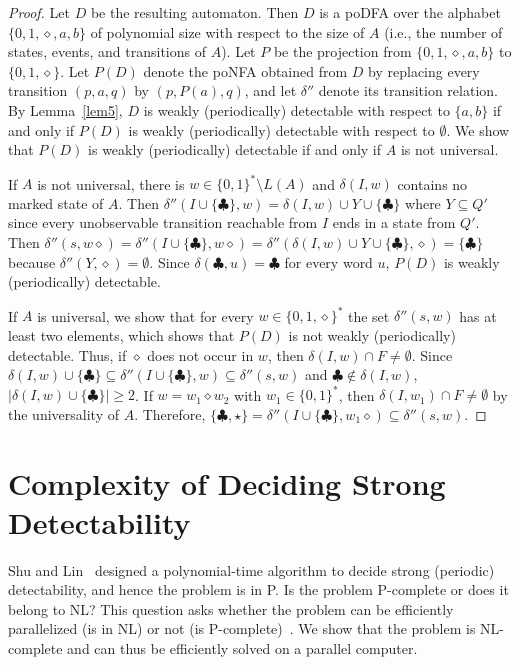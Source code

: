 \documentclass[twocolumn,amsthm]{autartx}
\begin{document}
\begin{proof}
    Let $D$ be the resulting automaton. Then $D$ is a poDFA over the alphabet $\{0,1,\diamond,a,b\}$ of polynomial size with respect to the size of $A$ (i.e., the number of states, events, and transitions of $A$).
%     
    Let $P$ be the projection from $\{0,1,\diamond,a,b\}$ to $\{0,1,\diamond\}$.
    Let $P(D)$ denote the poNFA obtained from $D$ by replacing every transition $(p,a,q)$ by $(p,P(a),q)$, and let $\delta''$ denote its transition relation. By Lemma~\ref{lem5}, $D$ is weakly (periodically) detectable with respect to $\{a,b\}$ if and only if $P(D)$ is weakly (periodically) detectable with respect to $\emptyset$. We show that $P(D)$ is weakly (periodically) detectable if and only if $A$ is not universal.

    If $A$ is not universal, there is $w\in\{0,1\}^*\setminus L(A)$ and $\delta(I,w)$ contains no marked state of $A$. Then $\delta''(I\cup\{\clubsuit\},w) = \delta(I,w) \cup Y \cup \{\clubsuit\}$ where $Y\subseteq Q'$ since every unobservable transition reachable from $I$ ends in a state from $Q'$. Then $\delta''(s,w\diamond) = \delta''(I\cup\{\clubsuit\},w\diamond) = \delta''(\delta(I,w)\cup Y\cup \{\clubsuit\},\diamond)=\{\clubsuit\}$ because $\delta''(Y,\diamond)=\emptyset$. Since $\delta(\clubsuit,u)=\clubsuit$ for every word $u$, $P(D)$ is weakly (periodically) detectable.
    
    If $A$ is universal, we show that for every $w\in \{0,1,\diamond\}^*$ the set $\delta''(s,w)$ has at least two elements, which shows that $P(D)$ is not weakly (periodically) detectable. Thus, if $\diamond$ does not occur in $w$, then $\delta(I,w)\cap F\neq\emptyset$. Since $\delta(I,w)\cup\{\clubsuit\}\subseteq \delta''(I\cup\{\clubsuit\},w) \subseteq \delta''(s,w)$ and $\clubsuit\notin \delta(I,w)$, $|\delta(I,w)\cup\{\clubsuit\}|\ge 2$. If $w=w_1\diamond w_2$ with $w_1\in\{0,1\}^*$, then $\delta(I,w_1) \cap F \neq \emptyset$ by the universality of $A$. Therefore, $\{\clubsuit,\star\}=\delta''(I \cup \{\clubsuit\},w_1\diamond) \subseteq \delta''(s,w)$.
  \end{proof}


\section{Complexity of Deciding Strong Detectability}
  Shu and Lin~\cite{ShuLin2011} designed a polynomial-time algorithm to decide strong (periodic) detectability, and hence the problem is in P. Is the problem P-complete or does it belong to NL? This question asks whether the problem can be efficiently parallelized (is in NL) or not (is P-complete)~\cite{AroraBarak2009}. We show that the problem is NL-complete and can thus be efficiently solved on a parallel computer.
  
\end{document}
